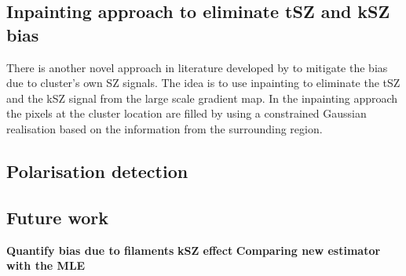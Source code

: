  \subsection*{Inpainting approach to eliminate tSZ and kSZ bias}
 There is another novel approach in literature developed by \citet{raghunathan19} to mitigate the bias due to cluster's own SZ signals. 
 The idea is to use inpainting to eliminate the tSZ and the kSZ signal from the large scale gradient map. 
 In the inpainting approach the pixels at the cluster location are filled by using a constrained Gaussian realisation based on the information from the surrounding region.
 \subsection*{Polarisation detection}
 
 

\subsection*{Future work}
\textbf{Quantify bias due to filaments}
\textbf{kSZ effect}
\textbf{Comparing new estimator with the MLE}
